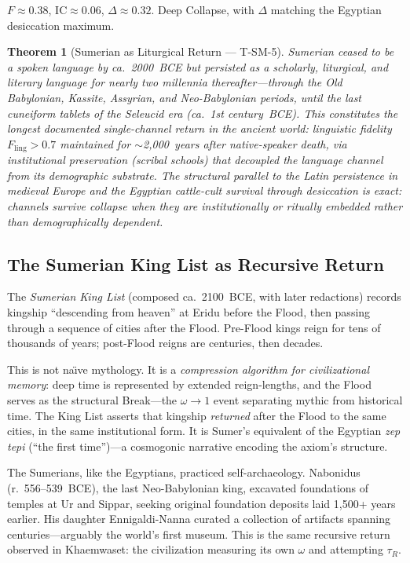 \documentclass[
  aps,
  prd,
  twocolumn,
  superscriptaddress,
  nofootinbib,
  floatfix
]{revtex4-2}
\newtheorem{theorem}{Theorem}
\newcommand{\tR}{\tau_{\!R}}
\newcommand{\IC}{\mathrm{IC}}
\begin{document}
$F \approx 0.38$, $\IC \approx 0.06$,
$\Delta \approx 0.32$.  Deep Collapse, with $\Delta$
matching the Egyptian desiccation maximum.

\begin{theorem}[Sumerian as Liturgical Return ---
T-SM-5]\label{thm:sumerian-lang}
Sumerian ceased to be a spoken language by ca.\
2000~BCE but persisted as a scholarly, liturgical,
and literary language for nearly two millennia
thereafter---through the Old Babylonian, Kassite,
Assyrian, and Neo-Babylonian periods, until the
last cuneiform tablets of the Seleucid era (ca.\
1st century~BCE).  This constitutes the longest
documented single-channel return in the ancient
world: linguistic fidelity $F_{\mathrm{ling}} > 0.7$
maintained for $\sim$2,000~years after native-speaker
death, via institutional preservation (scribal
schools) that decoupled the language channel from its
demographic substrate.  The structural parallel to
the Latin persistence in medieval Europe and the
Egyptian cattle-cult survival through desiccation is
exact: channels survive collapse when they are
institutionally or ritually embedded rather than
demographically dependent.
\end{theorem}


\subsection{The Sumerian King List as Recursive
Return}\label{sec:kinglist}

The \emph{Sumerian King List} (composed ca.\
2100~BCE, with later redactions) records kingship
``descending from heaven'' at Eridu before the Flood,
then passing through a sequence of cities after the
Flood.  Pre-Flood kings reign for tens of thousands of
years; post-Flood reigns are centuries, then decades.

This is not na\"{\i}ve mythology.  It is a
\emph{compression algorithm for civilizational
memory}: deep time is represented by extended
reign-lengths, and the Flood serves as the
structural Break---the $\omega \to 1$ event
separating mythic from historical time.  The King
List asserts that kingship \emph{returned} after the
Flood to the same cities, in the same institutional
form.  It is Sumer's equivalent of the Egyptian
\emph{zep tepi} (``the first time'')---a cosmogonic
narrative encoding the axiom's structure.

The Sumerians, like the Egyptians, practiced
self-archaeology.  Nabonidus (r.\ 556--539~BCE),
the last Neo-Babylonian king, excavated foundations
of temples at Ur and Sippar, seeking original
foundation deposits laid 1,500+ years earlier.  His
daughter Ennigaldi-Nanna curated a collection of
artifacts spanning centuries---arguably the world's
first museum.  This is the same recursive return
observed in Khaemwaset: the civilization measuring
its own $\omega$ and attempting $\tR$.
\end{document}
